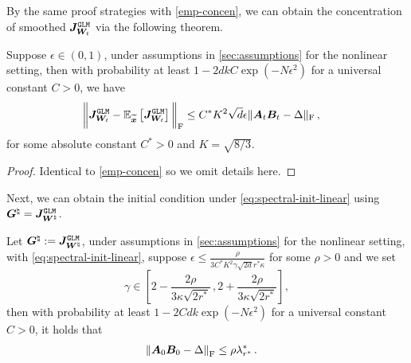 By the same proof strategies with \cref{emp-concen}, we can obtain the concentration of smoothed $\bm J_{\bm W_t}^{\tt GLM}$ via the following theorem.
\begin{theorem} \label{smooth-emp-concen}
Suppose $\epsilon \in (0,1)$, under assumptions in \cref{sec:assumptions} for the nonlinear setting, then with probability at least $1-2dkC\operatorname{exp}\left(- N\epsilon^2\right)$ for a universal constant $C>0$, we have
\begin{align*}
    \bigg\|\bm J_{\bm W_t}^{\tt GLM} - \mathbb{E}_{\widetilde{\bm x}}\left[\bm J_{\bm W_t}^{\tt GLM}\right]\bigg\|_{\rm F} & \leq C^* K^2\sqrt{d}\epsilon \|\bm A_t \bm B_t - \Delta\|_{\rm F}\,,
\end{align*}
for some absolute constant $C^*>0$ and $K=\sqrt{8/3}$.
\end{theorem}
\begin{proof}
    Identical to \cref{emp-concen} so we omit details here.
\end{proof}
Next, we can obtain the initial condition under \eqref{eq:spectral-init-linear} using $\bm G^\natural = \bm J_{\bm W^\natural}^{\tt GLM}$.
\begin{lemma}
\label{smo-A0B0-init-risk}
    Let $\bm G^\natural := \bm J_{\bm W^\natural}^{\tt GLM}$, under assumptions in \cref{sec:assumptions} for the nonlinear setting, with \eqref{eq:spectral-init-linear}, suppose $\epsilon \leq \frac{\rho}{3C^*K^2\gamma\sqrt{2d}r^*\kappa}$ for some $\rho>0$ and we set
    \begin{equation*}
       \gamma\in\left[2-\frac{2\rho}{3\kappa\sqrt{2r^*}}\,,2+\frac{2\rho}{3\kappa\sqrt{2r^*}}\right],
    \end{equation*}
    then with probability at least $1-2Cdk\operatorname{exp}(-N\epsilon^2)$ for a universal constant $C>0$, it holds that
    \begin{align*}
        \left\|\bm A_0 \bm B_0 - \Delta\right\|_{\rm F} & \leq \rho\lambda^*_{r^*}\,.
    \end{align*}
\end{lemma}
